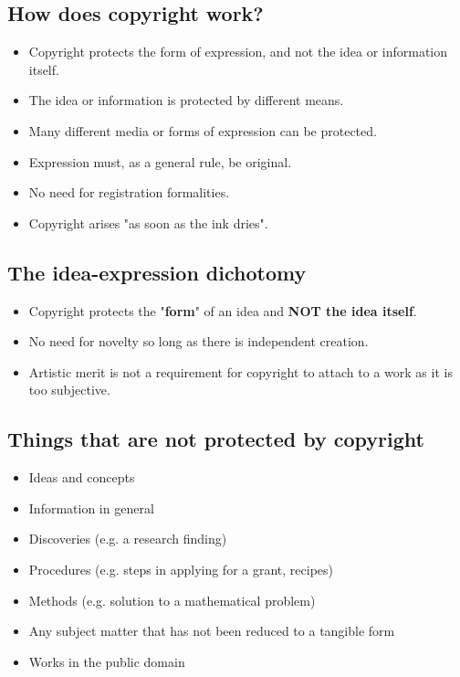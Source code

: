 \documentclass[11pt]{article}
\begin{document}
\subsection{How does copyright work?}
\label{sec:org7bc6b44}
\begin{itemize}
\item Copyright protects the form of expression, and not the idea or information itself.
\item The idea or information is protected by different means.
\item Many different media or forms of expression can be protected.
\item Expression must, as a general rule, be original.
\item No need for registration formalities.
\item Copyright arises "as soon as the ink dries".
\end{itemize}

\subsection{The idea-expression dichotomy}
\label{sec:org572cafd}
\begin{itemize}
\item Copyright protects the "\textbf{form}" of an idea and \textbf{NOT the idea itself}.
\item No need for novelty so long as there is independent creation.
\item Artistic merit is not a requirement for copyright to attach to a work as it is too subjective.
\end{itemize}

 \newpage

\subsection{Things that are not protected by copyright}
\label{sec:orga7c8bcc}
\begin{itemize}
\item Ideas and concepts
\item Information in general
\item Discoveries (e.g. a research finding)
\item Procedures (e.g. steps in applying for a grant, recipes)
\item Methods (e.g. solution to a mathematical problem)
\item Any subject matter that has not been reduced to a tangible form
\item Works in the public domain
\end{itemize}
\end{document}
